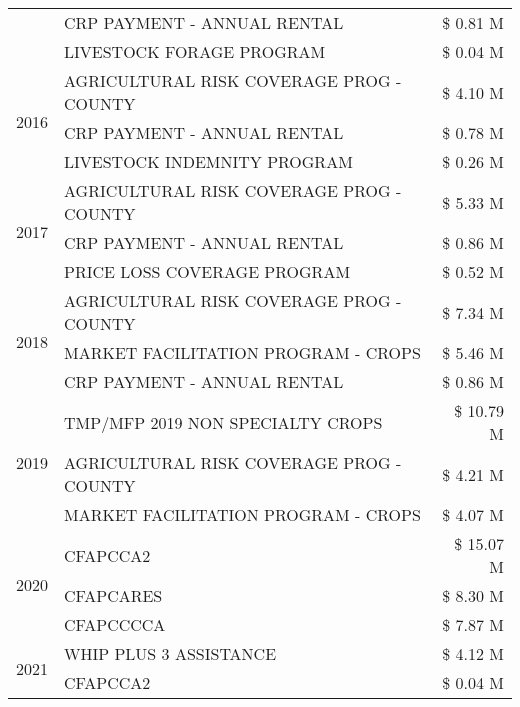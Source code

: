 \begin{tabular}{llr}
 & CRP PAYMENT - ANNUAL RENTAL & \$ 0.81 M \\
 & LIVESTOCK FORAGE PROGRAM & \$ 0.04 M \\
\cline{1-3}
\multirow[t]{3}{*}{2016} & AGRICULTURAL RISK COVERAGE PROG - COUNTY & \$ 4.10 M \\
 & CRP PAYMENT - ANNUAL RENTAL & \$ 0.78 M \\
 & LIVESTOCK INDEMNITY PROGRAM & \$ 0.26 M \\
\cline{1-3}
\multirow[t]{3}{*}{2017} & AGRICULTURAL RISK COVERAGE PROG - COUNTY & \$ 5.33 M \\
 & CRP PAYMENT - ANNUAL RENTAL & \$ 0.86 M \\
 & PRICE LOSS COVERAGE PROGRAM & \$ 0.52 M \\
\cline{1-3}
\multirow[t]{3}{*}{2018} & AGRICULTURAL RISK COVERAGE PROG - COUNTY & \$ 7.34 M \\
 & MARKET FACILITATION PROGRAM - CROPS & \$ 5.46 M \\
 & CRP PAYMENT - ANNUAL RENTAL & \$ 0.86 M \\
\cline{1-3}
\multirow[t]{3}{*}{2019} & TMP/MFP 2019 NON SPECIALTY CROPS & \$ 10.79 M \\
 & AGRICULTURAL RISK COVERAGE PROG - COUNTY & \$ 4.21 M \\
 & MARKET FACILITATION PROGRAM - CROPS & \$ 4.07 M \\
\cline{1-3}
\multirow[t]{3}{*}{2020} & CFAPCCA2 & \$ 15.07 M \\
 & CFAPCARES & \$ 8.30 M \\
 & CFAPCCCCA & \$ 7.87 M \\
\cline{1-3}
\multirow[t]{2}{*}{2021} & WHIP PLUS 3 ASSISTANCE & \$ 4.12 M \\
 & CFAPCCA2 & \$ 0.04 M \\
\cline{1-3}
\bottomrule
\end{tabular}
